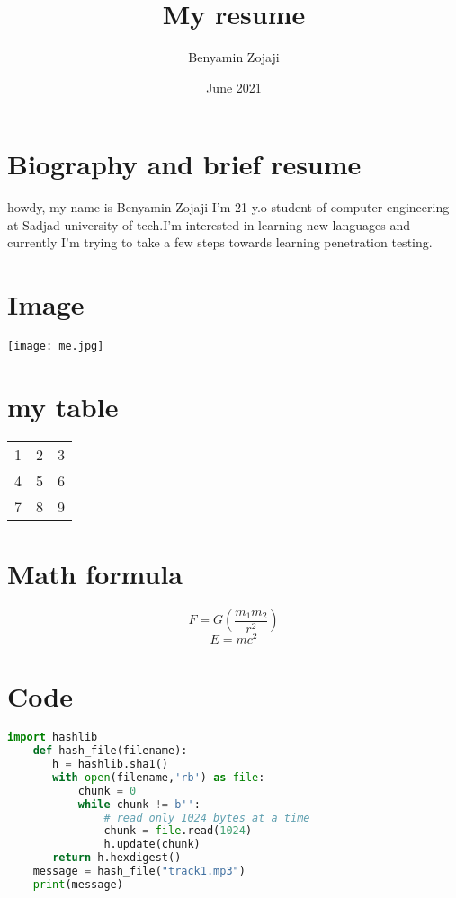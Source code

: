 \documentclass{scrartcl}
\title{My resume}
\author{Benyamin Zojaji}
\date{June 2021}
\begin{document}
\maketitle

\section{Biography and brief resume}
    howdy, my name is Benyamin Zojaji I'm 21 y.o student of computer engineering at Sadjad university of tech.I'm interested in learning new languages and currently I'm trying to take a few steps towards  learning penetration testing.
\section{Image}
    \texttt{[image: me.jpg]}
\section{my table}
    \begin{center}
    \begin{tabular}{ |c|c|c| } 
     \hline
     1 & 2 & 3 \\ 
     4 & 5 & 6 \\ 
     7 & 8 & 9 \\ 
     \hline
    \end{tabular}
    \end{center}
\section{Math formula}
    \[ 
    F = G \left( \frac{m_1 m_2}{r^2} \right)
    \]
    \[E=mc^2\]
\section{Code}
    \begin{lstlisting}[language=Python]
    import hashlib
    def hash_file(filename):
       h = hashlib.sha1()
       with open(filename,'rb') as file:
           chunk = 0
           while chunk != b'':
               # read only 1024 bytes at a time
               chunk = file.read(1024)
               h.update(chunk)
       return h.hexdigest()
    message = hash_file("track1.mp3")
    print(message)
    \end{lstlisting}
\end{document}

